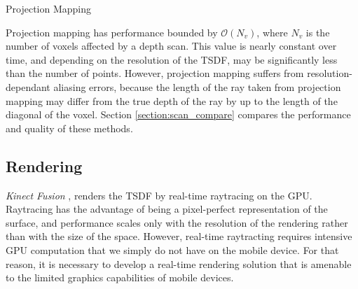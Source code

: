 \documentclass[10pt,twocolumn,letterpaper]{article}
\begin{document}
\begin{algorithm} 
	\caption{Projection Mapping}
	\label{alg:projection_mapping}
	\begin{algorithmic}[1]
		 
		  
	     
		    	\label{alg:line:voxel_carve}
			\EndIf
	    \EndIf
		  
			\label{alg:line:tsdf_update}
		\EndIf
	\EndFor
	\end{algorithmic}
\end{algorithm}

Projection mapping has performance bounded by $\mathcal{O}(N_v)$, where $N_v$ is
the number of voxels affected by a depth scan. This value is nearly constant
over time, and depending on the resolution of the TSDF, may be significantly
less than the number of points. However, projection mapping suffers from resolution-dependant aliasing errors,
because the length of the ray taken from projection mapping may differ from the
true depth of the ray by up to the length of the diagonal of the voxel.  
Section \ref{section:scan_compare} compares the performance and quality of
these methods.


\subsection{Rendering}
\label{section:render}
\textit{Kinect Fusion} \cite{Newcombe}, renders the TSDF by real-time
raytracing on the GPU. Raytracing has the advantage of being a pixel-perfect
representation of the surface, and performance scales only with the resolution
of the rendering rather than with the size of the space. However, real-time
raytracting requires intensive GPU computation that we simply do not have on
the mobile device. For that reason, it is necessary to develop a real-time
rendering solution that is amenable to the limited graphics capabilities of mobile devices.
\end{document}
